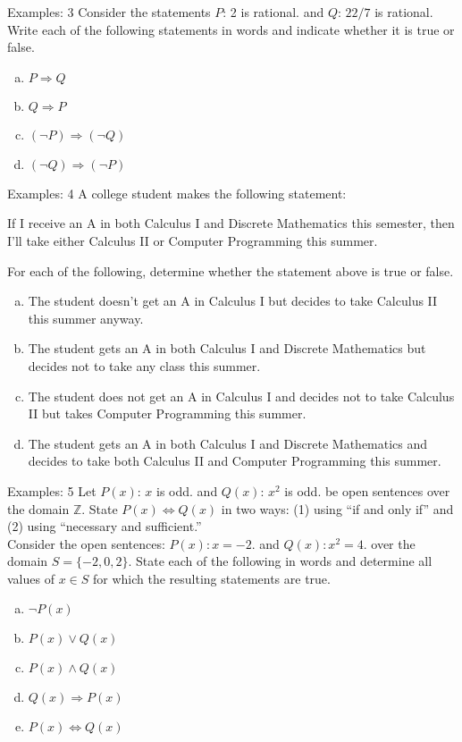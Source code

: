\documentclass{beamer}
\begin{document}
\begin{frame}{Examples: 3}
Consider the statements $P$: 2 is rational. and $Q$: $22/7$ is rational.
Write each of the following statements in words and indicate whether it is true or false.
\begin{enumerate}[(a)]
    \item $P \Rightarrow Q$
    \item $Q \Rightarrow P$
    \item $(\neg P) \Rightarrow (\neg Q)$
    \item $(\neg Q) \Rightarrow (\neg P)$
\end{enumerate}
\end{frame}

\begin{frame}{Examples: 4}
A college student makes the following statement:
\begin{center}
    If I receive an A in both Calculus I and Discrete Mathematics this semester, then I'll take either Calculus II or Computer Programming this summer.
\end{center}
For each of the following, determine whether the statement above is true or false.
\begin{enumerate}[(a)]
    \item The student doesn't get an A in Calculus I but decides to take Calculus II this summer anyway.
    \item The student gets an A in both Calculus I and Discrete Mathematics but decides not to take any class this summer.
    \item The student does not get an A in Calculus I and decides not to take Calculus II but takes Computer Programming this summer.
    \item The student gets an A in both Calculus I and Discrete Mathematics and decides to take both Calculus II and Computer Programming this summer.

\end{enumerate}
\end{frame}

\begin{frame}{Examples: 5}
Let $P(x)$: $x$ is odd. and $Q(x)$: $x^2$ is odd. be open sentences over the domain $\mathbb{Z}$. State $P(x) \Leftrightarrow Q(x)$ in two ways: (1) using ``if and only if'' and (2) using ``necessary and sufficient.''\\
\vspace{0.4cm}
Consider the open sentences:
$P(x) : x = -2$. and $Q(x) : x^2 = 4$.
over the domain $S = \{-2, 0, 2\}$. State each of the following in words and determine all values of $x \in S$ for which the resulting statements are true.
\begin{enumerate}[(a)]
    \item $\neg P(x)$
    \item $P(x) \lor Q(x)$
    \item $P(x) \land Q(x)$
    \item $Q(x) \Rightarrow P(x)$
    \item $P(x) \Leftrightarrow Q(x)$
\end{enumerate}

\end{frame}
\end{document}
